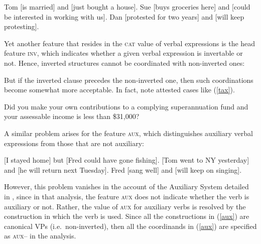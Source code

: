 \eal
\label{vform2}
\ex Tom [is married] and [just bought  a house].
\ex Sue [buys groceries here] and [could be interested in working with us].
\ex Dan [protested for two years] and [will keep protesting].
\zl

Yet another feature that resides in the \textsc{cat} value of verbal expressions is the head feature
\textsc{inv}, which indicates whether a given verbal expression is invertable or not. Hence,
inverted structures cannot be coordinated with non-inverted ones: 


\eal
{}
\zl

\eal
{}
\zl

\noindent
But if the inverted clause precedes the non-inverted one, then such coordinations become somewhat
more acceptable. In fact, \citet[1332--1333]{rodney} note attested cases like (\ref{tax}).

\ea
Did you make your own contributions to a complying superannuation fund and
your assessable income is less than \$31,000?\label{tax}\label{ex-did-you-make-and-your-asessable-income-is}
\z

\noindent
A similar problem arises for the feature \textsc{aux}, which distinguishes auxiliary verbal expressions from those that
are not auxiliary:

\eal
\label{aux}
\ex {}[I stayed home]\sub{\aux $-$} but [Fred could have gone fishing]\sub{\aux $+$}.
\ex {}[Tom went to NY yesterday]\sub{\aux $-$} and [he will return next Tuesday]\sub{\aux $+$}.
\ex Fred [sang well]\sub{\aux $-$} and [will keep on singing]\sub{\aux $+$}.
\zl

\noindent
However, this problem vanishes in the account of the  Auxiliary System detailed in \citet{SagEtAl20}, since in that analysis,
the feature \textsc{aux} does not indicate whether the verb is auxiliary or not. Rather, the value of \textsc{aux} for auxiliary verbs is resolved by the construction in which the verb is used. Since all the constructions in (\ref{aux}) are canonical VPs (i.e.\ non-inverted), then 
all the coordinands in (\ref{aux}) are specified as \textsc{aux--} in
the \citet{SagEtAl20} analysis.




